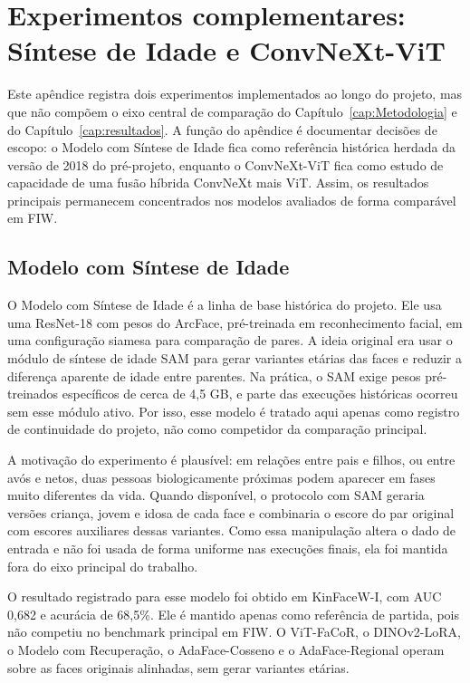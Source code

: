 \chapter[Experimentos complementares: Síntese de Idade e ConvNeXt-ViT]{Experimentos complementares: Síntese de Idade e ConvNeXt-ViT}
\label{ap:modelos-perifericos}

Este apêndice registra dois experimentos implementados ao longo do projeto, mas que não compõem o eixo central de comparação do Capítulo~\ref{cap:Metodologia} e do Capítulo~\ref{cap:resultados}. A função do apêndice é documentar decisões de escopo: o Modelo com Síntese de Idade fica como referência histórica herdada da versão de 2018 do pré-projeto, enquanto o ConvNeXt-ViT fica como estudo de capacidade de uma fusão híbrida ConvNeXt mais ViT. Assim, os resultados principais permanecem concentrados nos modelos avaliados de forma comparável em FIW.

\section{Modelo com Síntese de Idade}

O Modelo com Síntese de Idade é a linha de base histórica do projeto. Ele usa uma ResNet-18 com pesos do ArcFace, pré-treinada em reconhecimento facial, em uma configuração siamesa para comparação de pares. A ideia original era usar o módulo de síntese de idade SAM \cite{alaluf2022sam} para gerar variantes etárias das faces e reduzir a diferença aparente de idade entre parentes. Na prática, o SAM exige pesos pré-treinados específicos de cerca de 4,5 GB, e parte das execuções históricas ocorreu sem esse módulo ativo. Por isso, esse modelo é tratado aqui apenas como registro de continuidade do projeto, não como competidor da comparação principal.

A motivação do experimento é plausível: em relações entre pais e filhos, ou entre avós e netos, duas pessoas biologicamente próximas podem aparecer em fases muito diferentes da vida. Quando disponível, o protocolo com SAM geraria versões criança, jovem e idosa de cada face e combinaria o escore do par original com escores auxiliares dessas variantes. Como essa manipulação altera o dado de entrada e não foi usada de forma uniforme nas execuções finais, ela foi mantida fora do eixo principal do trabalho.

O resultado registrado para esse modelo foi obtido em KinFaceW-I, com AUC 0,682 e acurácia de 68,5\%. Ele é mantido apenas como referência de partida, pois não competiu no benchmark principal em FIW. O ViT-FaCoR, o DINOv2-LoRA, o Modelo com Recuperação, o AdaFace-Cosseno e o AdaFace-Regional operam sobre as faces originais alinhadas, sem gerar variantes etárias.

